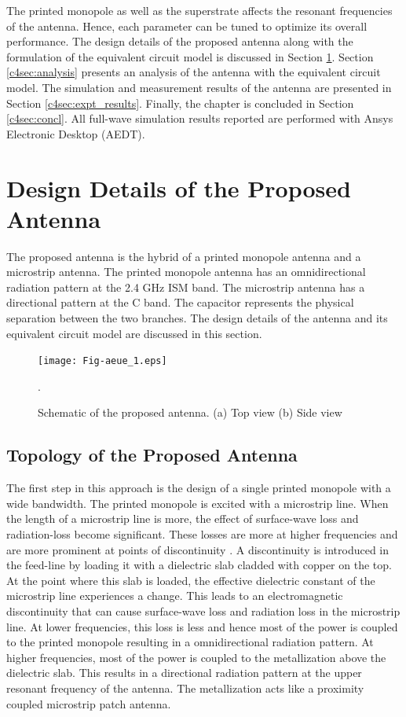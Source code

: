 The printed monopole as well as the superstrate affects the resonant frequencies of the antenna. Hence, each parameter can be tuned to optimize its overall performance. The design details of the proposed antenna along with the formulation of the equivalent circuit model is discussed in Section \ref{c4sec:design}. Section \ref{c4sec:analysis} presents an analysis of the antenna with the equivalent circuit model. The simulation and measurement results of the antenna are presented in Section \ref{c4sec:expt_results}. Finally, the chapter is concluded in Section \ref{c4sec:concl}. All full-wave simulation results reported are performed with Ansys Electronic Desktop (AEDT).
\section{Design Details of the Proposed Antenna}\label{c4sec:design}
The proposed antenna is the hybrid of a printed monopole antenna and a microstrip antenna. The printed monopole antenna has an omnidirectional radiation pattern at the 2.4 GHz ISM band. The microstrip antenna has a directional pattern at the C band. The capacitor represents the physical separation between the two branches. The design details of the antenna and its equivalent circuit model are discussed in this section.

\begin{figure}[t]
\centering
\texttt{[image: Fig-aeue\_1.eps]}
\caption{Schematic of the proposed antenna. (a) Top view (b) Side view}\label{topology}.
\end{figure}

\subsection{Topology of the Proposed Antenna}
The first step in this approach is the design of a single printed monopole with a wide bandwidth. The printed monopole is excited with a microstrip line. When the length of a microstrip line is more, the effect of surface-wave loss and radiation-loss become significant. These losses are more at higher frequencies and are more prominent at points of discontinuity \cite{rad_loss}. A discontinuity is introduced in the feed-line by loading it with a dielectric slab cladded with copper on the top. At the point where this slab is loaded, the effective dielectric constant of the microstrip line experiences a change. This leads to an electromagnetic discontinuity that can cause surface-wave loss and radiation loss in the microstrip line. At lower frequencies, this loss is less and hence most of the power is coupled to the printed monopole resulting in a omnidirectional radiation pattern. At higher frequencies, most of the power is coupled to the metallization above the dielectric slab. This results in a directional radiation pattern at the upper resonant frequency of the antenna. The metallization acts like a proximity coupled microstrip patch antenna.

